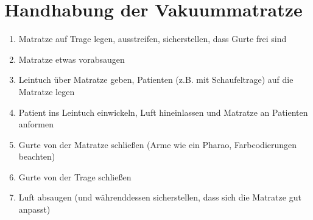 \chapter{Handhabung der Vakuummatratze}
\begin{enumerate}
    \item Matratze auf Trage legen, ausstreifen, sicherstellen, dass Gurte frei sind
    \item Matratze etwas vorabsaugen
    \item Leintuch über Matratze geben, Patienten (z.B. mit Schaufeltrage) auf die Matratze legen
    \item Patient ins Leintuch einwickeln, Luft hineinlassen und Matratze an Patienten anformen
    \item Gurte von der Matratze schließen (Arme wie ein Pharao, Farbcodierungen beachten)
    \item Gurte von der Trage schließen
    \item Luft absaugen (und währenddessen sicherstellen, dass sich die Matratze gut anpasst)
\end{enumerate}